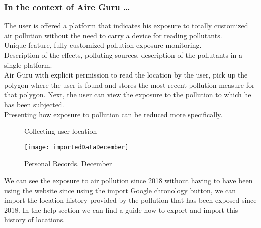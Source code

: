 \subsubsection*{In the context of Aire Guru \ldots} 

The user is offered a platform that indicates his exposure to totally customized air pollution without the need to carry a device for reading pollutants.\\

Unique feature, fully customized pollution exposure monitoring.\\

Description of the effects, polluting sources, description of the pollutants in a single platform. \\

Air Guru with explicit permission to read the location by the user, pick up the polygon where
the user is found and stores the most recent pollution measure for that polygon.
Next, the user can view the exposure to the pollution to which he has been subjected.\\

Presenting how exposure to pollution can be reduced more specifically.\\

\begin{figure}[ht]
    \centering 
    \caption{Collecting user location}
\end{figure}

\begin{figure}[ht]
    \centering
    \texttt{[image: importedDataDecember]}
    \caption{Personal Records. December}
\end{figure}

We can see the exposure to air pollution since 2018 without having to have been using the website since
using the import Google chronology button, we can import the location history provided by the pollution that has been exposed since 2018.
In the help section we can find a guide how to export and import this history of locations.